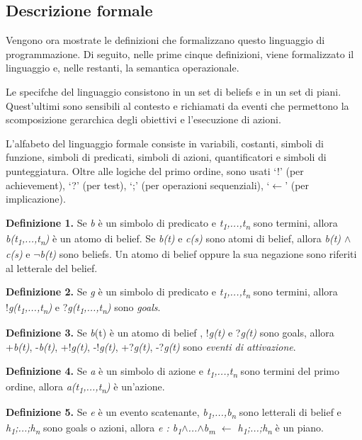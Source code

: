 \subsection{Descrizione formale}
Vengono ora mostrate le definizioni che formalizzano questo linguaggio di programmazione.
Di seguito, nelle prime cinque definizioni, viene formalizzato il linguaggio e, nelle restanti, la semantica operazionale.

\medskip
Le specifche del linguaggio consistono in un set di beliefs e in un set di piani. Quest'ultimi sono sensibili al contesto e richiamati da eventi che permettono la scomposizione gerarchica degli obiettivi e l'esecuzione di azioni.

L'alfabeto del linguaggio formale consiste in variabili, costanti, simboli di funzione, simboli di predicati, simboli di azioni, quantificatori e simboli di punteggiatura. Oltre alle logiche del primo ordine, sono usati `!' (per achievement), `?' (per test), `;' (per operazioni sequenziali), `$\leftarrow$' (per implicazione).

\smallskip
\textbf{Definizione 1.} Se \textit{b} \`e un simbolo di predicato e \textit{t\textsubscript{1},...,t\textsubscript{n}} sono termini, allora \textit{b(t\textsubscript{1},...,t\textsubscript{n})} \`e un atomo di belief. Se \textit{b(t)} e \textit{c(s)} sono atomi di belief, allora \textit{b(t) $\land$ c(s)} e \textit{$\neg$b(t)} sono beliefs. Un atomo di belief oppure la sua negazione sono riferiti al letterale del belief.

\smallskip
\textbf{Definizione 2.} Se \textit{g} \`e un simbolo di predicato e \textit{t\textsubscript{1},...,t\textsubscript{n}} sono termini, allora !\textit{g(t\textsubscript{1},...,t\textsubscript{n})} e ?\textit{g(t\textsubscript{1},...,t\textsubscript{n})} sono \textit{goals}.

\smallskip
\textbf{Definizione 3.} Se \textit{b}(t) \`e un atomo di belief , !\textit{g(t)} e ?\textit{g(t)} sono goals, allora +\textit{b(t)}, -\textit{b(t)}, +!\textit{g(t)}, -!\textit{g(t)}, +?\textit{g(t)}, -?\textit{g(t)} sono \textit{eventi di attivazione}.

\smallskip
\textbf{Definizione 4.} Se \textit{a} \`e un simbolo di azione e \textit{t\textsubscript{1},...,t\textsubscript{n}} sono termini del primo ordine, allora \textit{a(t\textsubscript{1},...,t\textsubscript{n})} \`e un'azione.

\smallskip
\textbf{Definizione 5.} Se \textit{e} \`e un evento scatenante, \textit{b\textsubscript{1},...,b\textsubscript{n}} sono letterali di belief e \textit{h\textsubscript{1};...;h\textsubscript{n}} sono goals o azioni, allora \textit{e : b\textsubscript{1}$\land$...$\land$b\textsubscript{m} $\leftarrow$ h\textsubscript{1};...;h\textsubscript{n}} \`e un piano.

